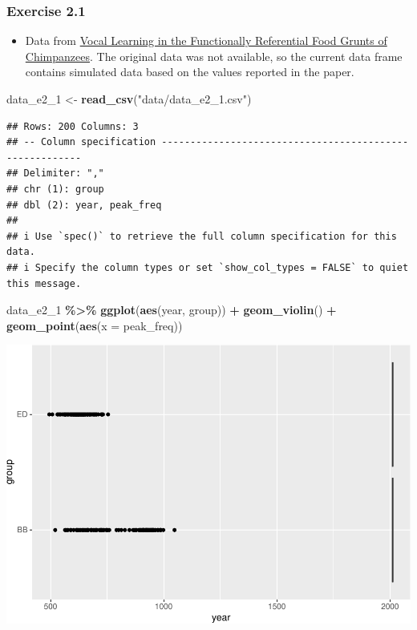 \documentclass[
]{article}
\newenvironment{Shaded}{\begin{snugshade}}{\end{snugshade}}
\newcommand{\AttributeTok}[1]{\textcolor[rgb]{0.13,0.29,0.53}{#1}}
\newcommand{\FunctionTok}[1]{\textcolor[rgb]{0.13,0.29,0.53}{\textbf{#1}}}
\newcommand{\NormalTok}[1]{#1}
\newcommand{\OtherTok}[1]{\textcolor[rgb]{0.56,0.35,0.01}{#1}}
\newcommand{\SpecialCharTok}[1]{\textcolor[rgb]{0.81,0.36,0.00}{\textbf{#1}}}
\newcommand{\StringTok}[1]{\textcolor[rgb]{0.31,0.60,0.02}{#1}}
\providecommand{\tightlist}{%
  \setlength{\itemsep}{0pt}\setlength{\parskip}{0pt}}
\begin{document}
\subsubsection{Exercise 2.1}\label{exercise-2.1}

\begin{itemize}
\tightlist
\item
  Data from \href{https://doi.org/10.1016/j.cub.2014.12.032}{Vocal
  Learning in the Functionally Referential Food Grunts of Chimpanzees}.
  The original data was not available, so the current data frame
  contains simulated data based on the values reported in the paper.
\end{itemize}

\begin{Shaded}
\begin{Highlighting}[]
\NormalTok{data\_e2\_1 }\OtherTok{\textless{}{-}} \FunctionTok{read\_csv}\NormalTok{(}\StringTok{"data/data\_e2\_1.csv"}\NormalTok{)}
\end{Highlighting}
\end{Shaded}

\begin{verbatim}
## Rows: 200 Columns: 3
## -- Column specification --------------------------------------------------------
## Delimiter: ","
## chr (1): group
## dbl (2): year, peak_freq
## 
## i Use `spec()` to retrieve the full column specification for this data.
## i Specify the column types or set `show_col_types = FALSE` to quiet this message.
\end{verbatim}

\begin{Shaded}
\begin{Highlighting}[]
\NormalTok{data\_e2\_1 }\SpecialCharTok{\%\textgreater{}\%}
  \FunctionTok{ggplot}\NormalTok{(}\FunctionTok{aes}\NormalTok{(year, group)) }\SpecialCharTok{+}
  \FunctionTok{geom\_violin}\NormalTok{() }\SpecialCharTok{+}
  \FunctionTok{geom\_point}\NormalTok{(}\FunctionTok{aes}\NormalTok{(}\AttributeTok{x =}\NormalTok{ peak\_freq))}
\end{Highlighting}
\end{Shaded}

\includegraphics{analysis_files/figure-latex/e2-1-1.pdf}
\end{document}
